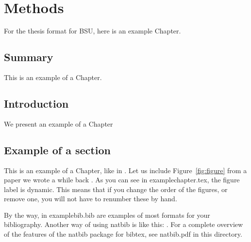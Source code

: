 \chapter{Methods}
\label{chap:methods}

For the thesis format for BSU, here is an example Chapter.

\section{Summary}
 
This is an example of a Chapter. 

\section{Introduction}

We present an example of a Chapter

\section{\nobreak Example of a section}

This is an example of a Chapter, like in \citet{Krauth2021}. Let us
include Figure~\ref{fig:figure} from a paper we wrote a while back
\citep{Wang2004a}. As you can see in examplechapter.tex, the
figure label is dynamic. This means that if you change the order of
the figures, or remove one, you will not have to renumber these by
hand.

By the way, in examplebib.bib are examples of most formats for your
bibliography. Another way of using natbib is like this: \cite[or][for
example]{mythesis}. For a complete overview of the features of the
natbib package for bibtex, see natbib.pdf in this directory.

